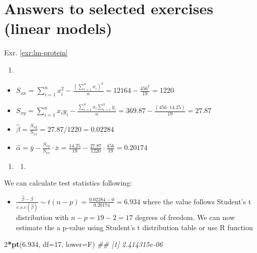 \documentclass[
]{book}
\newenvironment{Shaded}{\begin{snugshade}}{\end{snugshade}}
\newcommand{\CommentTok}[1]{\textcolor[rgb]{0.56,0.35,0.01}{\textit{#1}}}
\newcommand{\DataTypeTok}[1]{\textcolor[rgb]{0.13,0.29,0.53}{#1}}
\newcommand{\DecValTok}[1]{\textcolor[rgb]{0.00,0.00,0.81}{#1}}
\newcommand{\FloatTok}[1]{\textcolor[rgb]{0.00,0.00,0.81}{#1}}
\newcommand{\KeywordTok}[1]{\textcolor[rgb]{0.13,0.29,0.53}{\textbf{#1}}}
\newcommand{\NormalTok}[1]{#1}
\newcommand{\OperatorTok}[1]{\textcolor[rgb]{0.81,0.36,0.00}{\textbf{#1}}}
\providecommand{\tightlist}{%
  \setlength{\itemsep}{0pt}\setlength{\parskip}{0pt}}
\theoremstyle{definition}
\theoremstyle{definition}
\theoremstyle{definition}
\theoremstyle{remark}
\begin{document}
\hypertarget{answers-to-selected-exercises-linear-models}{%
\section*{Answers to selected exercises (linear models)}\label{answers-to-selected-exercises-linear-models}}

Exr. \ref{exr:lm-protein}

\begin{enumerate}
\def\labelenumi{\alph{enumi})}
\tightlist
\item
\end{enumerate}

\begin{itemize}
\tightlist
\item
  \(S_{xx} = \sum_{i=1}^{n}x_i^2-\frac{(\sum_{i=1}^{n}x_i)^2}{n} = 12164 - \frac{456^2}{19} = 1220\)
\item
  \(S_{xy} = \sum_{i=1}^nx_iy_i-\frac{\sum_{i=1}^{n}x_i\sum_{i=1}^{n}y_i}{n} = 369.87 - \frac{(456 \cdot 14.25)}{19} = 27.87\)
\item
  \(\hat{\beta} = \frac{S_{xy}}{S_{xx}} = 27.87 / 1220 = 0.02284\)
\item
  \(\hat{\alpha} = \bar{y}-\frac{S_{xy}}{S_{xx}}\cdot \bar{x} = \frac{14.25}{19}-\frac{27.87}{1220}\cdot \frac{456}{19} = 0.20174\)
\end{itemize}

\begin{enumerate}
\def\labelenumi{\alph{enumi})}
\setcounter{enumi}{1}
\item
  \begin{enumerate}
  \def\labelenumii{\roman{enumii}.}
  \tightlist
  \item
  \end{enumerate}
\end{enumerate}

We can calculate test statistics following:

\begin{itemize}
\tightlist
\item
  \(\frac{\hat{\beta} - \beta}{e.s.e(\hat{\beta})} \sim t(n-p) = \frac{0.02284 - 0}{0.20174} = 6.934\) where the value follows Student's t distribution with \(n-p = 19 - 2 = 17\) degrees of freedom. We can now estimate the a p-value using Student's t distribution table or use R function
\end{itemize}

\begin{Shaded}
\begin{Highlighting}[]
\DecValTok{2}\OperatorTok{*}\KeywordTok{pt}\NormalTok{(}\FloatTok{6.934}\NormalTok{, }\DataTypeTok{df=}\DecValTok{17}\NormalTok{, }\DataTypeTok{lower=}\NormalTok{F)}
\CommentTok{\#\# [1] 2.414315e{-}06}
\end{Highlighting}
\end{Shaded}
\end{document}
